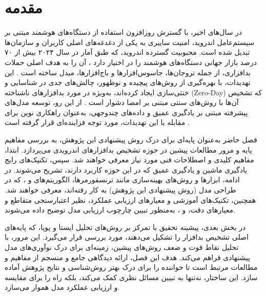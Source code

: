 \section{مقدمه}
در سال‌های اخیر، با گسترش روزافزون استفاده از دستگاه‌های هوشمند مبتنی بر سیستم‌عامل اندروید، امنیت سایبری به یکی از دغدغه‌های اصلی کاربران و سازمان‌ها تبدیل شده است. محبوبیت گسترده اندروید، که طبق آمار  در سال ۲۰۲۴ بیش از ۷۰ درصد بازار جهانی دستگاه‌های هوشمند را در اختیار دارد \cite{Statista2024}، آن را به هدف اصلی حملات بدافزاری، از جمله تروجان‌ها، جاسوس‌افزارها و باج‌افزارها، مبدل ساخته است \cite{AndroidSecurity}. این تهدیدات، با بهره‌گیری از روش‌های پیچیده و نوظهور، چالش‌های جدی در شناسایی و خنثی‌سازی ایجاد کرده‌اند، به‌ویژه در مورد بدافزارهای ناشناخته (Zero-Day) که تشخیص آن‌ها با روش‌های سنتی مبتنی بر امضا دشوار است \cite{AndroidMalwareSurvey}. از این رو، توسعه مدل‌های پیشرفته مبتنی بر یادگیری عمیق و داده‌های چندوجهی، به‌عنوان راهکاری نوین برای مقابله با این تهدیدات، مورد توجه فزاینده‌ای قرار گرفته است \cite{DeepLearningMalware}.

فصل حاضر به‌عنوان پایه‌ای برای درک روش پیشنهادی این پژوهش، به بررسی مفاهیم پایه و مرور مطالعات پیشین در حوزه تشخیص بدافزارهای اندرویدی می‌پردازد. ابتدا، مفاهیم کلیدی و اصطلاحات فنی مورد نیاز معرفی خواهند شد. سپس، تکنیک‌های رایج یادگیری ماشین و یادگیری عمیق که در این حوزه کاربرد دارند، تشریح می‌شوند. در ادامه، ابزارها و روش‌های بهینه‌سازی مانند ترنسفورمرها، الگوریتم‌های  و ، که در طراحی مدل  (روش پیشنهادی این پژوهش) به کار رفته‌اند، معرفی خواهند شد. همچنین، تکنیک‌های آموزشی و معیارهای ارزیابی عملکرد، نظیر اعتبارسنجی متقاطع و معیارهای دقت، \LTRfootnote
 و ، به‌منظور تبیین چارچوب ارزیابی مدل توضیح داده می‌شوند.

در بخش بعدی، پیشینه تحقیق با تمرکز بر روش‌های تحلیل ایستا و پویا، که پایه‌های اصلی تشخیص بدافزار را تشکیل می‌دهند، مورد بررسی قرار می‌گیرد. این مرور، با تحلیل نقاط قوت و ضعف روش‌های پیشین، زمینه‌ای برای درک نوآوری‌های مدل پیشنهادی فراهم می‌کند. هدف این فصل، ارائه دیدگاهی جامع و منسجم از مفاهیم و مطالعات مرتبط است تا خواننده را برای درک بهتر روش‌شناسی و نتایج پژوهش آماده سازد. این ساختار، نه‌تنها به تبیین مسائل نظری کمک می‌کند، بلکه راه را برای مقایسه و ارزیابی عملکرد مدل  هموار می‌سازد.

